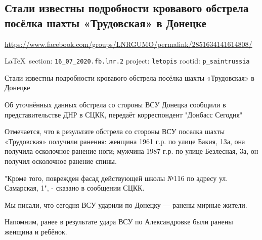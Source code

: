  
 
  
 
\subsection{Стали известны подробности кровавого обстрела посёлка шахты «Трудовская» в Донецке}
\label{sec:16_07_2020.fb.lnr.2}
\url{https://www.facebook.com/groups/LNRGUMO/permalink/2851634141614808/}

\vspace{0.5cm}
{\ifDEBUG\small\LaTeX~section: \verb|16_07_2020.fb.lnr.2| project: \verb|letopis| rootid: \verb|p_saintrussia|\fi}
\vspace{0.5cm}

Стали известны подробности кровавого обстрела посёлка шахты «Трудовская» в
Донецке

Об уточнённых данных обстрела со стороны ВСУ Донецка сообщили в
представительстве ДНР в СЦКК, передаёт корреспондент "Донбасс Сегодня"

Отмечается, что в результате обстрела со стороны ВСУ поселка шахты «Трудовская»
получили ранения: женщина 1961 г.р. по улице Бакия, 13а, она получила
осколочное ранение ноги; мужчина 1987 г.р. по улице Безлесная, 3а, он получил
осколочное ранение спины.

"Кроме того, поврежден фасад действующей школы №116 по адресу ул. Самарская,
1", - сказано в сообщении СЦКК.

Мы писали, что сегодня ВСУ ударили по Донецку --- ранены мирные жители.

Напомним, ранее в результате удара ВСУ по Александровке были ранены женщина и
ребёнок.
